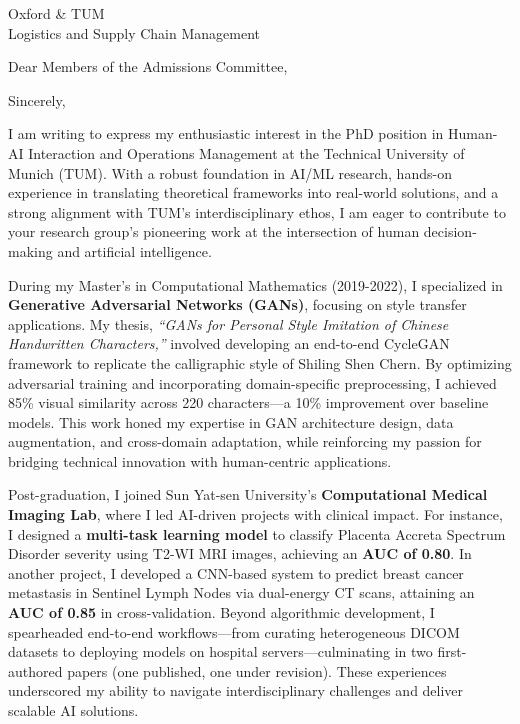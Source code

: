 \documentclass[11pt,a4paper, final]{moderncv}
\begin{document}
{Oxford \& TUM\\
Logistics and Supply Chain Management}
\date{\today}
\opening{Dear Members of the Admissions Committee,}
\closing{Sincerely,}
\makelettertitle
\thispagestyle{empty}
\pagestyle{empty}
I am writing to express my enthusiastic interest in the PhD position in 
Human-AI Interaction and Operations Management at the Technical University of Munich (TUM). 
With a robust foundation in AI/ML research, 
hands-on experience in translating theoretical frameworks into real-world solutions, 
and a strong alignment with TUM's interdisciplinary ethos, 
I am eager to contribute to your research group's pioneering work at the intersection of 
human decision-making and artificial intelligence.

During my Master's in Computational Mathematics (2019-2022), 
I specialized in \textbf{Generative Adversarial Networks (GANs)}, 
focusing on style transfer applications. 
My thesis, \emph{``GANs for Personal Style Imitation of Chinese Handwritten Characters,''} 
involved developing an end-to-end CycleGAN framework to replicate the calligraphic style of Shiling Shen Chern. 
By optimizing adversarial training and incorporating domain-specific preprocessing, 
I achieved 85\% visual similarity across 220 characters—a 10\% improvement over baseline models. 
This work honed my expertise in GAN architecture design, data augmentation, and cross-domain adaptation, 
while reinforcing my passion for bridging technical innovation with human-centric applications.

Post-graduation, I joined Sun Yat-sen University's \textbf{Computational Medical Imaging Lab}, 
where I led AI-driven projects with clinical impact. 
For instance, I designed a \textbf{multi-task learning model} to 
classify Placenta Accreta Spectrum Disorder severity using T2-WI MRI images, achieving an \textbf{AUC of 0.80}. 
In another project, I developed a CNN-based system to predict breast cancer metastasis 
in Sentinel Lymph Nodes via dual-energy CT scans, attaining an \textbf{AUC of 0.85} in cross-validation. 
Beyond algorithmic development, I spearheaded end-to-end workflows—from curating heterogeneous DICOM datasets to 
deploying models on hospital servers—culminating in two first-authored papers (one published, one under revision). 
These experiences underscored my ability to navigate interdisciplinary challenges and deliver scalable AI solutions.
\end{document}
